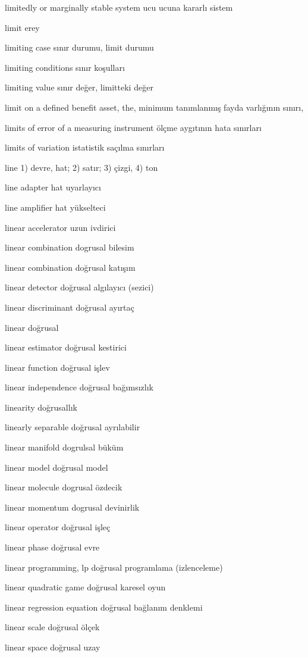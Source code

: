 \documentclass[12pt,fleqn]{article}\usepackage{../../common}
\begin{document}
limitedly or marginally stable system ucu ucuna kararlı sistem

limit erey

limiting case sınır durumu, limit durumu

limiting conditions sınır koşulları

limiting value sınır değer, limitteki değer

limit on a defined benefit asset, the, minimum tanımlanmış fayda varlığının sınırı,

limits of error of a measuring instrument ölçme aygıtının hata sınırları

limits of variation istatistik saçılma sınırları

line 1) devre, hat; 2) satır; 3) çizgi, 4) ton

line adapter hat uyarlayıcı

line amplifier hat yükselteci

linear accelerator uzun ivdirici

linear combination dogrusal bilesim

linear combination doğrusal katışım

linear detector doğrusal algılayıcı (sezici)

linear discriminant doğrusal ayırtaç

linear doğrusal

linear estimator doğrusal kestirici

linear function doğrusal işlev

linear independence doğrusal bağımsızlık

linearity doğrusallık

linearly separable doğrusal ayrılabilir

linear manifold dogrulsal büküm

linear model doğrusal model

linear molecule dogrusal özdecik

linear momentum dogrusal devinirlik

linear operator doğrusal işleç

linear phase doğrusal evre

linear programming, lp doğrusal programlama (izlenceleme)

linear quadratic game doğrusal karesel oyun

linear regression equation doğrusal bağlanım denklemi

linear scale doğrusal ölçek

linear space doğrusal uzay
\end{document}
